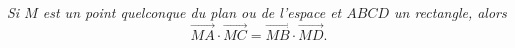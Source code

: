 \emph{Si $M$ est un point quelconque du plan ou de l'espace et $ABCD$ un
rectangle, alors}
\[
\overrightarrow{MA} \cdot \overrightarrow{MC} = \overrightarrow{MB} \cdot \overrightarrow{MD}.
\]
